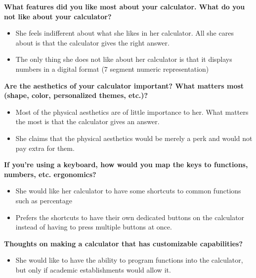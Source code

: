 \documentclass{article}
\begin{document}
\textbf{What features did you like most about your calculator. What do you not like about your calculator?}
\begin{itemize}
\itemsep0em 
\item She feels indifferent about what she likes in her calculator. All she cares about is that the calculator gives the right answer.
\item The only thing she does not like about her calculator is that it displays numbers in a digital format (7 segment numeric representation)
\end{itemize}

\textbf{Are the aesthetics of your calculator important? What matters most (shape, color,  personalized themes, etc.)?}
\begin{itemize}
\itemsep0em 
\item Most of the physical aesthetics are of little importance to her. What matters the most is that the calculator gives an answer.
\item She claims that the physical aesthetics would be merely a perk and would not pay extra for them.
\end{itemize}

\textbf{If you’re using a keyboard, how would you map the keys to functions, numbers, etc. ergonomics?}
\begin{itemize}
\itemsep0em 
\item She would like her calculator to have some shortcuts to common functions such as percentage 
\item Prefers the shortcuts to have their own dedicated buttons on the calculator instead of having to press multiple buttons at once.
\end{itemize}

\textbf{Thoughts on making a calculator that has customizable capabilities? }
\begin{itemize}
\itemsep0em 
\item She would like to have the ability to program functions into the calculator, but only if academic establishments would allow it. 
\end{itemize}
\pagebreak
\end{document}
